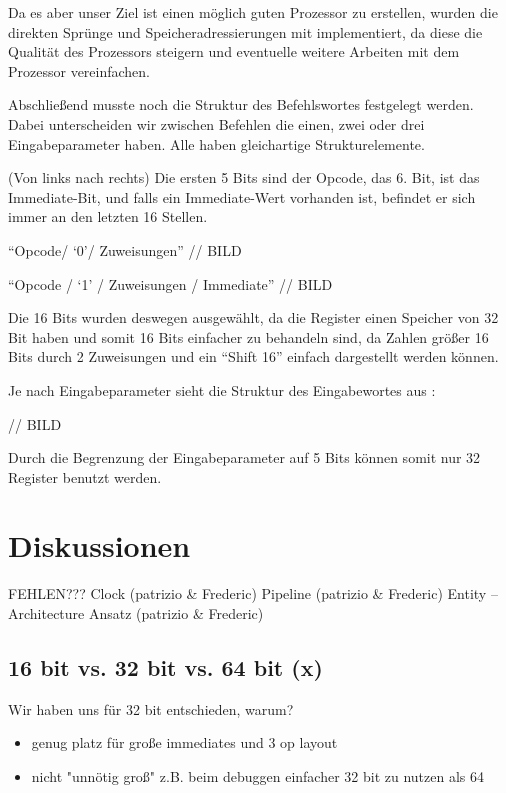 \documentclass[paper=a4,fontsize=12pt]{scrreprt}
\begin{document}
Da es aber unser Ziel ist einen möglich guten Prozessor zu erstellen, wurden die direkten Sprünge und Speicheradressierungen mit implementiert, da diese die Qualität des Prozessors steigern und eventuelle weitere Arbeiten mit dem Prozessor vereinfachen.

Abschließend musste noch die Struktur des Befehlswortes festgelegt werden. Dabei unterscheiden wir zwischen Befehlen die einen, zwei oder drei Eingabeparameter haben. Alle haben gleichartige Strukturelemente.

(Von links nach rechts) Die ersten 5 Bits sind der Opcode, das 6. Bit, ist das Immediate-Bit, und falls ein Immediate-Wert vorhanden ist, befindet er sich immer an den letzten 16 Stellen.

\enquote{Opcode/ \enquote{0}/ Zuweisungen}  // BILD

\enquote{Opcode / \enquote{1} / Zuweisungen / Immediate} // BILD

Die 16 Bits wurden deswegen ausgewählt, da die Register einen Speicher von 32 Bit haben und somit 16 Bits einfacher zu behandeln sind, da Zahlen größer 16 Bits durch 2 Zuweisungen und ein \enquote{Shift 16} einfach dargestellt werden können.

Je nach Eingabeparameter sieht die Struktur des Eingabewortes aus :

// BILD

Durch die Begrenzung der Eingabeparameter auf 5 Bits können somit nur 32 Register benutzt werden.

\section{Diskussionen}

FEHLEN???
Clock (patrizio \& Frederic)
Pipeline (patrizio \& Frederic)
Entity – Architecture Ansatz (patrizio \& Frederic)




\subsection{16 bit vs. 32 bit vs. 64 bit (x)}
Wir haben uns für 32 bit entschieden, warum?
\begin{itemize}
    \item genug platz für große immediates und 3 op layout
    \item nicht "unnötig groß" z.B. beim debuggen einfacher 32 bit zu nutzen als 64
\end{itemize}
\end{document}
